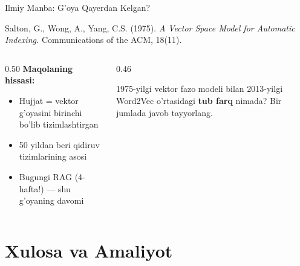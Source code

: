 \documentclass[aspectratio=169,11pt]{beamer}
\begin{document}
\begin{frame}{Ilmiy Manba: G'oya Qayerdan Kelgan?}
  \begin{tcolorbox}[defbox,title=Asl maqola]
    \small Salton, G., Wong, A., Yang, C.S. (1975).
    \textit{A Vector Space Model for Automatic Indexing.}
    Communications of the ACM, 18(11).
  \end{tcolorbox}
  \vspace{0.3em}
  \begin{columns}
    \begin{column}{0.50\textwidth}
      \textbf{Maqolaning hissasi:}
      \begin{itemize}\setlength\itemsep{3pt}
        \item Hujjat = vektor g'oyasini birinchi bo'lib
              tizimlashtirgan
        \item 50 yildan beri qidiruv tizimlarining asosi
        \item Bugungi RAG (4-hafta!) --- shu g'oyaning davomi
      \end{itemize}
    \end{column}
    \begin{column}{0.46\textwidth}
      \begin{tcolorbox}[warnbox,title=Muhokama savoli \textnormal{\scriptsize (keyingi darsga)}]
        \small 1975-yilgi vektor fazo modeli bilan 2013-yilgi
        Word2Vec o'rtasidagi \textbf{tub farq} nimada?
        Bir jumlada javob tayyorlang.
      \end{tcolorbox}
    \end{column}
  \end{columns}
\end{frame}

\section[Xulosa]{Xulosa va Amaliyot}
\end{document}
